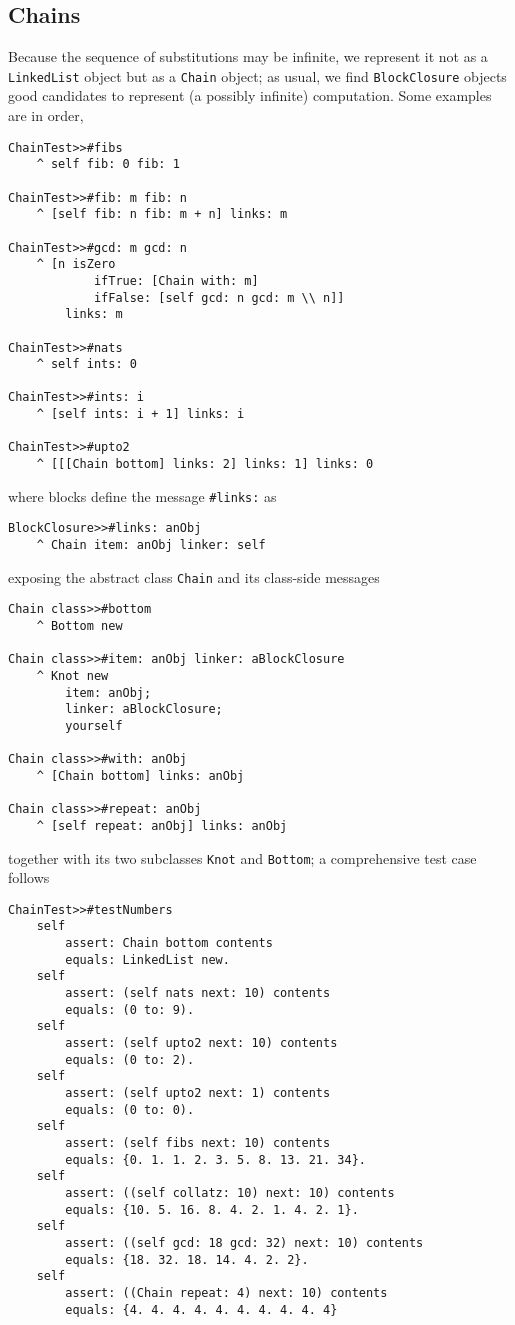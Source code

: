 \documentclass[a4paper,12pt]{article}
\begin{document}
\subsection{Chains}

Because the sequence of substitutions may be infinite, we
represent it not as a \Verb|LinkedList| object but as a \Verb|Chain| object;
as usual, we find \Verb|BlockClosure| objects good candidates to represent (a possibly
infinite) computation. Some examples are in order,
\begin{verbatim}
ChainTest>>#fibs
    ^ self fib: 0 fib: 1

ChainTest>>#fib: m fib: n 
    ^ [self fib: n fib: m + n] links: m

ChainTest>>#gcd: m gcd: n 
    ^ [n isZero 
            ifTrue: [Chain with: m]
            ifFalse: [self gcd: n gcd: m \\ n]] 
        links: m

ChainTest>>#nats
    ^ self ints: 0

ChainTest>>#ints: i 
    ^ [self ints: i + 1] links: i

ChainTest>>#upto2
    ^ [[[Chain bottom] links: 2] links: 1] links: 0
\end{verbatim}
where blocks define the message \Verb|#links:| as 
\begin{verbatim}
BlockClosure>>#links: anObj
    ^ Chain item: anObj linker: self
\end{verbatim}
exposing the abstract class \Verb|Chain| and its class-side messages
\begin{verbatim}
Chain class>>#bottom
    ^ Bottom new

Chain class>>#item: anObj linker: aBlockClosure 
    ^ Knot new 
        item: anObj;
        linker: aBlockClosure;
        yourself

Chain class>>#with: anObj 
    ^ [Chain bottom] links: anObj

Chain class>>#repeat: anObj 
    ^ [self repeat: anObj] links: anObj
\end{verbatim}
together with its two subclasses \Verb|Knot| and \Verb|Bottom|; a comprehensive
test case follows
\begin{verbatim}
ChainTest>>#testNumbers
    self 
        assert: Chain bottom contents 
        equals: LinkedList new.
    self
        assert: (self nats next: 10) contents
        equals: (0 to: 9).
    self
        assert: (self upto2 next: 10) contents
        equals: (0 to: 2).
    self
        assert: (self upto2 next: 1) contents
        equals: (0 to: 0).
    self 
        assert: (self fibs next: 10) contents 
        equals: {0. 1. 1. 2. 3. 5. 8. 13. 21. 34}.
    self 
        assert: ((self collatz: 10) next: 10) contents 
        equals: {10. 5. 16. 8. 4. 2. 1. 4. 2. 1}.
    self 
        assert: ((self gcd: 18 gcd: 32) next: 10) contents 
        equals: {18. 32. 18. 14. 4. 2. 2}.
    self 
        assert: ((Chain repeat: 4) next: 10) contents 
        equals: {4. 4. 4. 4. 4. 4. 4. 4. 4. 4}
\end{verbatim}
\end{document}
